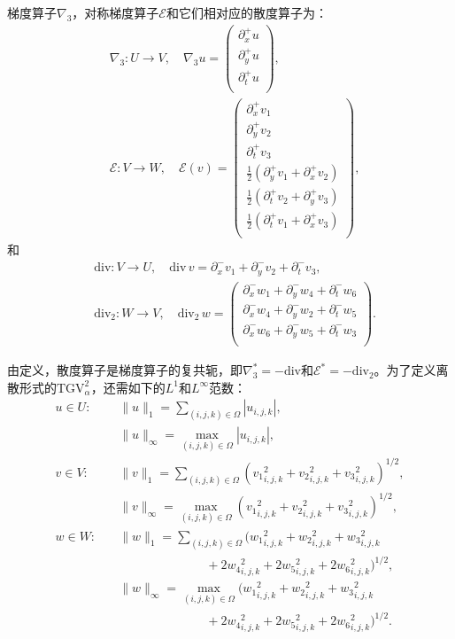 梯度算子$\nabla_3$，对称梯度算子$\mathcal{E}$和它们相对应的散度算子为：
\begin{align*}
&\nabla_3: U\rightarrow V,\quad\nabla_3 u =\begin{pmatrix}
\partial_x^+ u\\
\partial_y^+ u\\
\partial_t^+ u\\
\end{pmatrix},  \\
&\mathcal{E}: V\rightarrow W,\quad\mathcal{E} (v) =\begin{pmatrix}
\partial_x^+ v_1\\
\partial_y^+ v_2\\
\partial_t^+ v_3\\
\frac{1}{2}(\partial_y^+ v_1+\partial_x^+ v_2)\\
\frac{1}{2}(\partial_t^+ v_2+\partial_y^+ v_3)\\
\frac{1}{2}(\partial_t^+ v_1+\partial_x^+ v_3)\\
\end{pmatrix},
\end{align*}
和
\begin{align*}
&\text{div}: V\rightarrow U,\quad \text{div}\,v=\partial_x^- v_1+\partial_y^- v_2+\partial_t^- v_3, \\
&\mathrm{div}_2: W\rightarrow V,\quad \mathrm{div}_2\,w=\begin{pmatrix}
\partial_x^- w_1+\partial_y^- w_4+\partial_t^- w_6\\
\partial_x^- w_4+\partial_y^- w_2+\partial_t^- w_5\\
\partial_x^- w_6+\partial_y^- w_5+\partial_t^- w_3\\
\end{pmatrix}.
\end{align*}

由定义，散度算子是梯度算子的复共轭，即$\nabla_3^*=-\text{div}$和$\mathcal{E}^*=-\text{div}_2$。为了定义离散形式的$\mathrm{TGV}_{\alpha}^2$，还需如下的$L^1$和$L^\infty$范数：
\begin{equation*}
\begin{aligned}
u\in U: \quad & \|u\|_1 = \sum_{(i,j,k)\in\Omega} |u_{i,j,k}|, \\
&\|u\|_\infty = \max_{(i,j,k)\in\Omega} |u_{i,j,k}|, \\
v\in V: \quad &\|v\|_1 = \sum_{(i,j,k)\in\Omega}({v_1}_{i,j,k}^2+{v_2}_{i,j,k}^2+{v_3}_{i,j,k}^2)^{1/2}, \\
&\|v\|_\infty = \max_{(i,j,k)\in\Omega}({v_1}_{i,j,k}^2+{v_2}_{i,j,k}^2+{v_3}_{i,j,k}^2)^{1/2},\\
w\in W: \quad &\|w\|_1 = \sum_{(i,j,k)\in\Omega}({w_1}_{i,j,k}^2+{w_2}_{i,j,k}^2+{w_3}_{i,j,k}^2\\&\qquad\qquad\qquad\quad+2{w_4}_{i,j,k}^2+2{w_5}_{i,j,k}^2+2{w_6}_{i,j,k}^2)^{1/2},\\
&\|w\|_\infty = \max_{(i,j,k)\in\Omega}({w_1}_{i,j,k}^2+{w_2}_{i,j,k}^2+{w_3}_{i,j,k}^2\\
&\qquad\qquad\qquad\quad+2{w_4}_{i,j,k}^2+2{w_5}_{i,j,k}^2+2{w_6}_{i,j,k}^2)^{1/2}.
\end{aligned}
\end{equation*}

